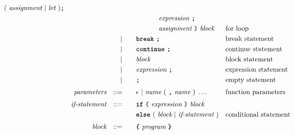 \begin{alignat*}{9}
                                          (\ \textit{assignment} \ | \  \textit{let}\ ) \textbf{\texttt{;}} \\
&&                       &&     &\quad && \ \ \ \ \ \ \ \ \ \ \textit{expression} \ \textbf{\texttt{;}} \\
&&                       &&     &\quad && \ \ \ \ \ \ \ \ \ \ \textit{assignment} \ \textbf{\texttt{)}} \ 
                                            \textit{block}
                                                           && \textrm{for loop}\\
&&                       && |   &\quad && \textbf{\texttt{break}}\ \textbf{\texttt{;}}
                                                           && \textrm{break statement}\\
&&                       && |   &\quad && \textbf{\texttt{continue}}\ \textbf{\texttt{;}}
                                                           && \textrm{continue statement}\\
&&                       && |   &\quad &&  \textit{block} 
                                                           && \textrm{block statement}\\
&&                       && |   &\quad &&  \textit{expression} \ \textbf{\texttt{;}}
                                                           && \textrm{expression statement} \\
&&                       && |   &\quad &&  \textbf{\texttt{;}}
                                                           && \textrm{empty statement} \\[1mm] 
&& \textit{parameters}   && ::= &\quad &&  \epsilon\ | \  \textit{name} \ 
                                                   (\ \textbf{\texttt{,}} \ \textit{name}\ )\ \ldots
                                                            && \textrm{function parameters}   \\[1mm]
&& \textit{if-statement} && ::= &\quad &&  \textbf{\texttt{if}}\
                                   \textbf{\texttt{(}}\ \textit{expression} \ \textbf{\texttt{)}}\ 
                                   \textit{block} \\
&&                       &&     &      && \textbf{\texttt{else}}\
                                          (\ \textit{block}
                                          \ | \
                                          \textit{if-statement} \ )
                                                            && \textrm{conditional statement}   \\[1mm]
&& \textit{block}        && ::= &      && \textbf{\texttt{\{}}\  \textit{program}   \ \textbf{\texttt{\}}} \quad

\end{alignat*}
